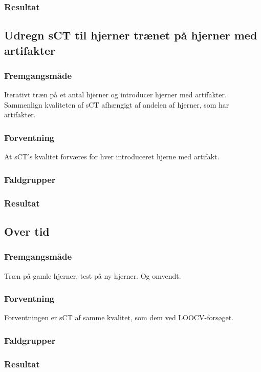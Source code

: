 \subsubsection{Resultat}

\subsection{Udregn sCT til hjerner trænet på hjerner med artifakter}
\subsubsection{Fremgangsmåde}
Iterativt træn på et antal hjerner og introducer hjerner med artifakter.
Sammenlign kvaliteten af sCT afhængigt af andelen af hjerner, som har
artifakter.

\subsubsection{Forventning}
At sCT's kvalitet forværes for hver introduceret hjerne med artifakt.

\subsubsection{Faldgrupper}

\subsubsection{Resultat}


\subsection{Over tid}
\subsubsection{Fremgangsmåde}
Træn på gamle hjerner, test på ny hjerner. Og omvendt.

\subsubsection{Forventning}
Forventningen er sCT af samme kvalitet, som dem ved LOOCV-forsøget.

\subsubsection{Faldgrupper}


\subsubsection{Resultat}


